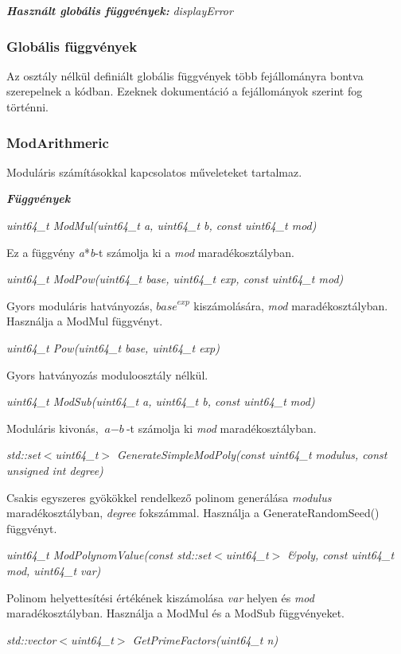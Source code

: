 \documentclass[12pt]{article}
\begin{document}
\textit{\textbf{Használt globális függvények: }}\textit{displayError}

\subsubsection{Globális függvények}
Az osztály nélkül definiált globális függvények több fejállományra bontva szerepelnek a kódban. Ezeknek dokumentáció a fejállományok szerint fog történni.

\subsubsection*{ModArithmeric}
Moduláris számításokkal kapcsolatos műveleteket tartalmaz.

\textit{\textbf{Függvények}}

\textit{uint64\_t ModMul(uint64\_t a, uint64\_t b, const uint64\_t mod)}

Ez a függvény \textit{a}*\textit{b}-t számolja ki a \textit{mod} 
maradékosztályban.

\textit{uint64\_t ModPow(uint64\_t base, uint64\_t exp, const uint64\_t mod)}

Gyors moduláris hatványozás, $\textit{base}^\textit{exp}$ kiszámolására, \textit{mod} maradékosztályban. Használja a ModMul függvényt.

\textit{uint64\_t Pow(uint64\_t base, uint64\_t exp)}

Gyors hatványozás moduloosztály nélkül.

\textit{uint64\_t ModSub(uint64\_t a, uint64\_t b, const uint64\_t mod)}

Moduláris kivonás, $\textit{a}-\textit{b}$-t számolja ki \textit{mod} maradékosztályban.

\textit{std::set$<$uint64\_t$>$ GenerateSimpleModPoly(const uint64\_t modulus, const unsigned int degree)}

Csakis egyszeres gyökökkel rendelkező polinom generálása \textit{modulus} maradékosztályban, \textit{degree} fokszámmal. Használja a GenerateRandomSeed() függvényt.

\textit{uint64\_t ModPolynomValue(const std::set$<$uint64\_t$>$ \&poly, const uint64\_t mod, uint64\_t var)}

Polinom helyettesítési értékének kiszámolása \textit{var} helyen és \textit{mod} maradékosztályban. Használja a ModMul és a ModSub függvényeket.

\textit{std::vector$<$uint64\_t$>$ GetPrimeFactors(uint64\_t n)}
\end{document}
